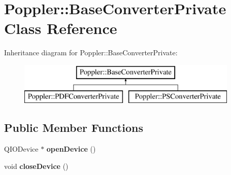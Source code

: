 \hypertarget{class_poppler_1_1_base_converter_private}{}\section{Poppler\+:\+:Base\+Converter\+Private Class Reference}
\label{class_poppler_1_1_base_converter_private}
Inheritance diagram for Poppler\+:\+:Base\+Converter\+Private\+:\begin{figure}[H]
\begin{center}
\leavevmode
\includegraphics[height=2.000000cm]{class_poppler_1_1_base_converter_private}
\end{center}
\end{figure}
\subsection*{Public Member Functions}
\begin{DoxyCompactItemize}
\item 
\mbox{\label{class_poppler_1_1_base_converter_private_abb0499bdfe71e5b9d56fb37cc7bb359d}} 
Q\+I\+O\+Device $\ast$ {\bfseries open\+Device} ()
\item 
\mbox{\label{class_poppler_1_1_base_converter_private_a07124f72d4220c163b3d89cde2963cff}} 
void {\bfseries close\+Device} ()
\end{DoxyCompactItemize}
